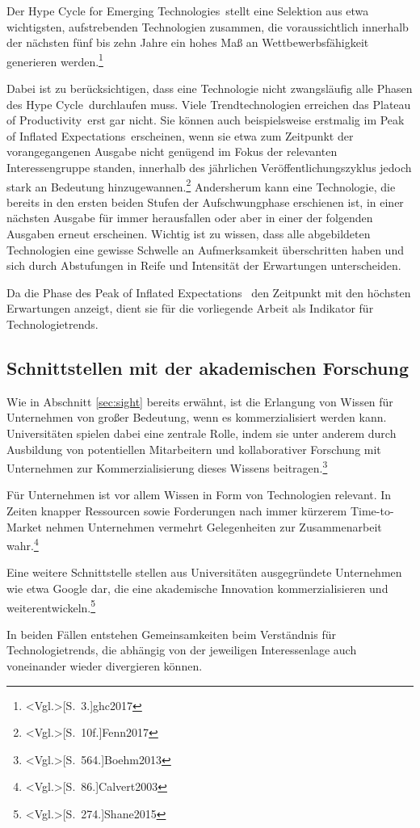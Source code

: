 Der \glqq Hype Cycle for Emerging Technologies\grqq~stellt eine Selektion aus etwa  wichtigsten, aufstrebenden Technologien zusammen, die voraussichtlich innerhalb der nächsten fünf bis zehn Jahre ein hohes Maß an Wettbewerbsfähigkeit generieren werden.\footnote{\citeNP<Vgl.>[S.~3.]{ghc2017}}

Dabei ist zu berücksichtigen, dass eine Technologie nicht zwangsläufig alle Phasen des \glqq Hype Cycle\grqq~durchlaufen muss. Viele Trendtechnologien erreichen das \glqq Plateau of Productivity\grqq~erst gar nicht. Sie können auch beispielsweise erstmalig im \glqq Peak of Inflated Expectations~erscheinen, wenn sie etwa zum Zeitpunkt der vorangegangenen Ausgabe nicht genügend im Fokus der relevanten Interessengruppe standen, innerhalb des jährlichen Veröffentlichungszyklus jedoch stark an Bedeutung hinzugewannen.\footnote{\citeNP<Vgl.>[S.~10f.]{Fenn2017}} Andersherum kann eine Technologie, die bereits in den ersten beiden Stufen der Aufschwungphase erschienen ist, in einer nächsten Ausgabe für immer herausfallen oder aber in einer der folgenden Ausgaben erneut erscheinen. Wichtig ist zu wissen, dass alle abgebildeten Technologien eine gewisse Schwelle an Aufmerksamkeit überschritten haben und sich durch Abstufungen in Reife und Intensität der Erwartungen unterscheiden.

Da die Phase des \glqq Peak of Inflated Expectations\grqq~ den Zeitpunkt mit den höchsten Erwartungen anzeigt, dient sie für die vorliegende Arbeit als Indikator für Technologietrends.

\subsection{Schnittstellen mit der akademischen Forschung}
Wie in Abschnitt \ref{sec:sight} bereits erwähnt, ist die Erlangung von Wissen für Unternehmen von großer Bedeutung, wenn es kommerzialisiert werden kann. Universitäten spielen dabei eine zentrale Rolle, indem sie unter anderem durch Ausbildung von potentiellen Mitarbeitern und kollaborativer Forschung mit Unternehmen zur Kommerzialisierung dieses Wissens beitragen.\footnote{\citeNP<Vgl.>[S.~564.]{Boehm2013}}

Für Unternehmen ist vor allem Wissen in Form von Technologien relevant. In Zeiten knapper Ressourcen sowie Forderungen nach immer kürzerem Time-to-Market nehmen Unternehmen vermehrt Gelegenheiten zur Zusammenarbeit wahr.\footnote{\citeNP<Vgl.>[S.~86.]{Calvert2003}}

Eine weitere Schnittstelle stellen aus Universitäten ausgegründete Unternehmen wie etwa Google dar, die eine akademische Innovation kommerzialisieren und weiterentwickeln.\footnote{\citeNP<Vgl.>[S.~274.]{Shane2015}}

In beiden Fällen entstehen Gemeinsamkeiten beim Verständnis für Technologietrends, die abhängig von der jeweiligen Interessenlage auch voneinander wieder divergieren können.